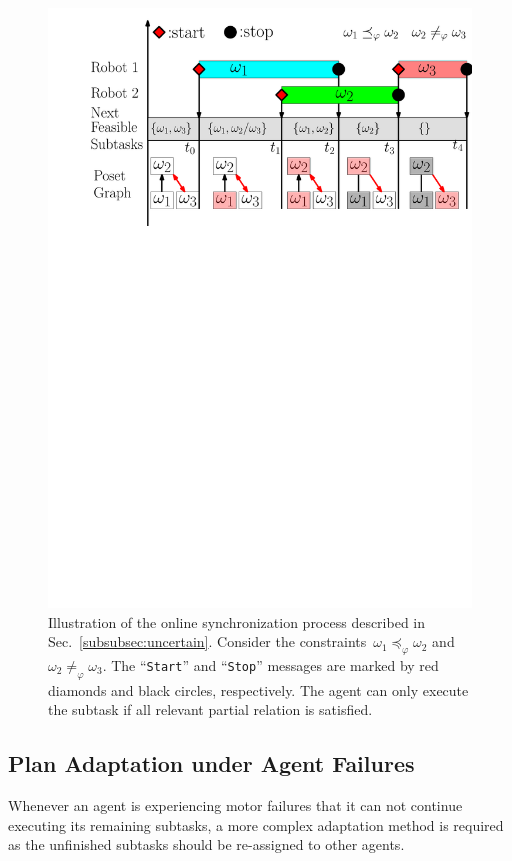 \begin{figure}[t!]
	\centering
	\includegraphics[width=0.8\linewidth]{figures/online_adapt2.pdf}
        \caption{
Illustration of the online synchronization process
described in Sec.~\ref{subsubsec:uncertain}.
Consider the constraints~$\omega_1 \preceq_{\varphi}\omega_2$
and~$\omega_2 \neq_\varphi \omega_3$.
The ``\texttt{Start}'' and ``\texttt{Stop}'' messages are
marked by red diamonds and black circles, respectively. The agent can only
execute the subtask if all relevant partial relation is satisfied.}
\label{fig:online adaption}
\end{figure}


\subsection{Plan Adaptation under Agent Failures}\label{subsubsec:failure}
Whenever an agent is experiencing motor failures that it can not
continue executing its remaining subtasks,
a more complex adaptation method is required as the unfinished subtasks
should be re-assigned to other agents.

